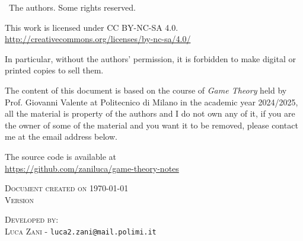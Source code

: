 
\textcopyright \ The authors. Some rights reserved.

This work is licensed under CC BY-NC-SA 4.0.\\
\url{http://creativecommons.org/licenses/by-nc-sa/4.0/}

In particular, without the authors' permission, it is forbidden to make digital or printed copies to sell them.

The content of this document is based on the course of \textit{Game Theory} held by Prof. Giovanni Valente at Politecnico di Milano in the academic year 2024/2025, all the material is property of the authors and I do not own any of it, if you are the owner of some of the material and you want it to be removed, please contact me at the email address below.

The \latex source code is available at\\
\url{https://github.com/zaniluca/game-theory-notes}


\textsc{Document created on \today}
\\\textsc{Version} \texttt{\commithash}


\textsc{Developed by:}\\
\textsc{Luca Zani} - \texttt{luca2.zani@mail.polimi.it}\\

